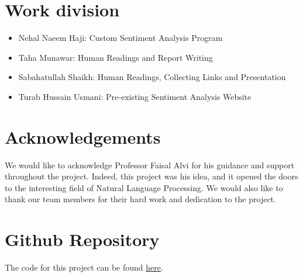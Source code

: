 \documentclass{report}
\begin{document}
\section{Work division}
\begin{itemize}
    \item Nehal Naeem Haji: Custom Sentiment Analysis Program
    \item Taha Munawar: Human Readings and Report Writing
    \item Sabahatullah Shaikh: Human Readings, Collecting Links and Presentation
    \item Turab Hussain Usmani: Pre-existing Sentiment Analysis Website
\end{itemize}

\section{Acknowledgements}
We would like to acknowledge Professor Faisal Alvi for his guidance and support throughout the project. Indeed, this project was his idea, and it opened the doors to the interesting field of Natural Language Processing. We would also like to thank our team members for their hard work and dedication to the project.

\section{Github Repository}
The code for this project can be found \href{https://github.com/NehalNN10/TNTStrike/}{here}.
\end{document}
